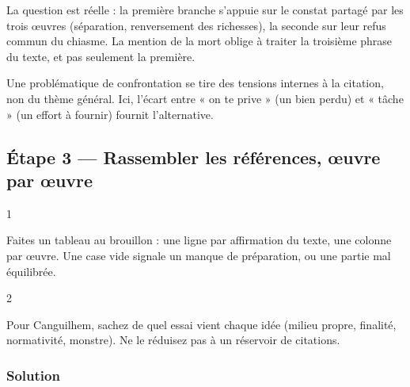 \documentclass[11pt,a4paper]{article}
\begin{document}
La question est réelle : la première branche s'appuie sur le constat partagé par les trois œuvres (séparation, renversement des richesses), la seconde sur leur refus commun du chiasme. La mention de la mort oblige à traiter la troisième phrase du texte, et pas seulement la première.

\begin{methode}

Une problématique de confrontation se tire des tensions internes à la citation, non du thème général. Ici, l'écart entre « on te prive » (un bien perdu) et « tâche » (un effort à fournir) fournit l'alternative.

\end{methode}

\hypertarget{uxe9tape-3-rassembler-les-ruxe9fuxe9rences-ux153uvre-par-ux153uvre}{%
\subsection{Étape 3 --- Rassembler les références, œuvre par œuvre}\label{uxe9tape-3-rassembler-les-ruxe9fuxe9rences-ux153uvre-par-ux153uvre}}

\begin{indication}{1}

Faites un tableau au brouillon : une ligne par affirmation du texte, une colonne par œuvre. Une case vide signale un manque de préparation, ou une partie mal équilibrée.

\end{indication}

\begin{indication}{2}

Pour Canguilhem, sachez de quel essai vient chaque idée (milieu propre, finalité, normativité, monstre). Ne le réduisez pas à un réservoir de citations.

\end{indication}

\hypertarget{solution-2}{%
\subsubsection{Solution}\label{solution-2}}
\end{document}
